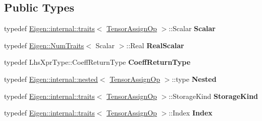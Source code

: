 \subsection*{Public Types}
\begin{DoxyCompactItemize}
\item 
\mbox{\label{class_eigen_1_1_tensor_assign_op_a3bcc5e7edb7dfeeac58a74b2929ea1bb}} 
typedef \hyperlink{struct_eigen_1_1internal_1_1traits}{Eigen\+::internal\+::traits}$<$ \hyperlink{class_eigen_1_1_tensor_assign_op}{Tensor\+Assign\+Op} $>$\+::Scalar {\bfseries Scalar}
\item 
\mbox{\label{class_eigen_1_1_tensor_assign_op_a9e5ccae9ca80d593a8a3ed5d52e63285}} 
typedef \hyperlink{group___core___module_struct_eigen_1_1_num_traits}{Eigen\+::\+Num\+Traits}$<$ Scalar $>$\+::Real {\bfseries Real\+Scalar}
\item 
\mbox{\label{class_eigen_1_1_tensor_assign_op_a2dfd9c5649eaae4565082b6bdc944270}} 
typedef Lhs\+Xpr\+Type\+::\+Coeff\+Return\+Type {\bfseries Coeff\+Return\+Type}
\item 
\mbox{\label{class_eigen_1_1_tensor_assign_op_a5e996d5a20f68bfdfc513d31ae44a097}} 
typedef \hyperlink{struct_eigen_1_1internal_1_1nested}{Eigen\+::internal\+::nested}$<$ \hyperlink{class_eigen_1_1_tensor_assign_op}{Tensor\+Assign\+Op} $>$\+::type {\bfseries Nested}
\item 
\mbox{\label{class_eigen_1_1_tensor_assign_op_a2fadabb31eae9e236d39c4a9894ff2f8}} 
typedef \hyperlink{struct_eigen_1_1internal_1_1traits}{Eigen\+::internal\+::traits}$<$ \hyperlink{class_eigen_1_1_tensor_assign_op}{Tensor\+Assign\+Op} $>$\+::Storage\+Kind {\bfseries Storage\+Kind}
\item 
\mbox{\label{class_eigen_1_1_tensor_assign_op_af16807ed07f0f32cb5cacbe8b287b78d}} 
typedef \hyperlink{struct_eigen_1_1internal_1_1traits}{Eigen\+::internal\+::traits}$<$ \hyperlink{class_eigen_1_1_tensor_assign_op}{Tensor\+Assign\+Op} $>$\+::Index {\bfseries Index}
\item 
\mbox{\label{class_eigen_1_1_tensor_assign_op_a3bcc5e7edb7dfeeac58a74b2929ea1bb}} 

\end{DoxyCompactItemize}
